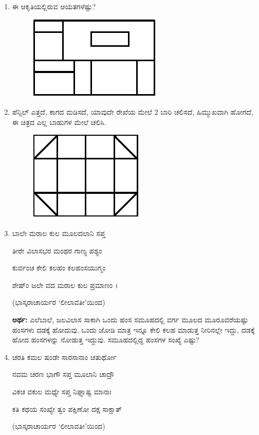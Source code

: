 \begin{enumerate}
\item ಈ ಆಕೃತಿಯಲ್ಲಿರುವ ಆಯತಗಳೆಷ್ಟು? 
\begin{figure}[H]
\centering
\includegraphics{images/chap6/q15.eps}
\end{figure}

\item ಪೆನ್ಸಿಲ್ ಎತ್ತದೆ, ಕಾಗದ ಮಡಿಸದೆ, ಯಾವುದೇ ರೇಖೆಯ ಮೇಲೆ 2 ಬಾರಿ ಚಲಿಸದೆ, ಹಿಮ್ಮುಖವಾಗಿ ಹೋಗದೆ, ಈ ಚಿತ್ರದ ಎಲ್ಲ ಬಾಹುಗಳ ಮೇಲೆ ಚಲಿಸಿ. 
\begin{figure}[H]
\centering
\includegraphics{images/chap6/q16.eps}
\end{figure}

\item ಬಾಲೇ ಮರಾಲ ಕುಲ ಮೂಲದಲಾನಿ ಸಪ್ತ 

ತೀರೇ ವಿಲಾಸಭರ ಮಂಥರ ಗಾಣ್ಯ ಪಶ್ಯಂ 

ಕುರ್ವಂಚ ಕೇಲಿ ಕಲಹಂ ಕಲಹಂಸಯುಗ್ಮಂ 

ಶೇಷ್ಂ ಜಲೇ ವದ ಮರಾಲ ಕುಲ ಪ್ರಮಾಣಂ ।

\smallskip
\hfill (ಭಾಸ್ಕರಾಚಾರ್ಯರ `ಲೀಲಾವತೀ'ಯಿಂದ)

\smallskip
{\bf ಅರ್ಥ:} ಎಲೆಬಾಲೆ, ಜಲವಿಲಾಸ ಸಾಕಾಗಿ ಒಂದು ಹಂಸ ಸಮೂಹದಲ್ಲಿ ವರ್ಗ ಮೂಲದ ಮೂರೂವರೆಯಷ್ಟು ಹಂಸಗಳು ದಡಕ್ಕೆ ಹೋದುವು. ಒಂದು ಜೋಡಿ ಮಾತ್ರ ಇನ್ನೂ ಕೇಲಿ ಕಲಹ ಮಾಡುತ್ತ ನೀರಿನಲ್ಲೇ ಇದ್ದು, ದಡಕ್ಕೆ ಹೋದ ಹಂಸಗಳನ್ನು ನೋಡುತ್ತ ಇದ್ದುವು. ಸಮೂಹದಲ್ಲಿದ್ದ ಹಂಸಗಳ ಸಂಖ್ಯೆ ಎಷ್ಟು? 

\item ಚರತಿ ಕಮಲ ಷಂಡೇ ಸಾರಸಾನಾಂ ಚತುರ್ಥೋ 

ನವಮ ಚರಣ ಭಾಗೌ ಸಪ್ತ ಮೂಲಾನಿ ಚಾದ್ರೌ 

ವಿಕಚ ವಕುಲ ಮಧ್ಯೇ ಸಪ್ತ ನಿಘ್ನಾಷ್ಟ ಮಾನಾಃ 

ಕತಿ ಕಥಯ ಸಂಖ್ಯೇ ತ್ವಂ ಪಕ್ಷಿಣೋ ದಕ್ಷ ಸಾಕ್ಷಾತ್ 

\smallskip
\hfill (ಭಾಸ್ಕರಾಚಾರ್ಯರ `ಲೀಲಾವತೀ'ಯಿಂದ)


\end{enumerate}
